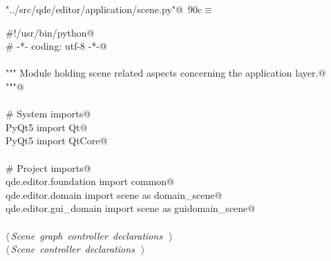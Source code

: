 \documentclass[
    a4paper,      %
    10pt,         %
    openright,    %
    notitlepage,  %
    parskip=half, %
]{scrreprt}       %
\theoremstyle{definition}                    %
\begin{document}
\begin{flushleft} \small
\begin{minipage}{\linewidth}\label{scrap145}\raggedright\small
{} \verb@"../src/qde/editor/application/scene.py"@\nobreak\ {\footnotesize {90c}}$\equiv$
\vspace{-1ex}
\begin{list}{}{} \item
\mbox{}\lstinline@#!/usr/bin/python@\\
\mbox{}\lstinline@# -*- coding: utf-8 -*-@\\
\mbox{}\lstinline@@\\
\mbox{}\lstinline@""" Module holding scene related aspects concerning the application layer.@\\
\mbox{}\lstinline@"""@\\
\mbox{}\lstinline@@\\
\mbox{}\lstinline@# System imports@\\
\mbox{}\lstinline@from PyQt5 import Qt@\\
\mbox{}\lstinline@from PyQt5 import QtCore@\\
\mbox{}\lstinline@@\\
\mbox{}\lstinline@# Project imports@\\
\mbox{}\lstinline@from qde.editor.foundation import common@\\
\mbox{}\lstinline@from qde.editor.domain     import scene as domain_scene@\\
\mbox{}\lstinline@from qde.editor.gui_domain import scene as guidomain_scene@\\
\mbox{}\lstinline@@\\
\mbox{}\lstinline@@\hbox{$\langle\,${\itshape Scene graph controller declarations}\nobreak\ {\footnotesize {}}$\,\rangle$}\lstinline@@\\
\mbox{}\lstinline@@\hbox{$\langle\,${\itshape Scene controller declarations}\nobreak\ {\footnotesize {}}$\,\rangle$}\lstinline@@\\
\mbox{}\lstinline@@{\NWsep}
\end{list}
\vspace{-1.5ex}
\footnotesize
\begin{list}{}{\setlength{\itemsep}{-\parsep}\setlength{\itemindent}{-\leftmargin}}

\item{}
\end{list}
\end{minipage}\vspace{4ex}
\end{flushleft}
\end{document}
